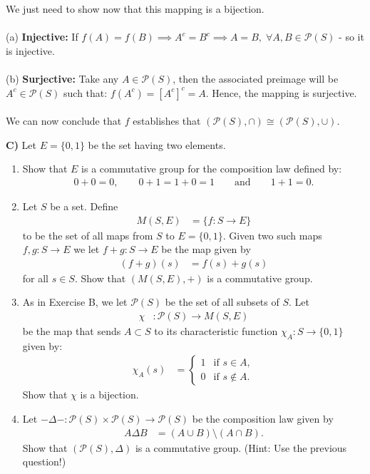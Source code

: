 \documentclass[12pt,a4paper]{article}
\begin{document}
\newpage
\noindent
We just need to show now that this mapping is a bijection.\\
\\
(a) \textbf{Injective:} If $f(A) = f(B) \implies A^c = B^c \implies A = B, \; \forall A,B \in \mathcal{P}(S)$ - so it is injective.\\
\\
(b) \textbf{Surjective:} Take any $A \in \mathcal{P}(S)$, then the associated preimage will be $A^c \in \mathcal{P}(S)$ such that:
$f(A^c) = [A^c]^c = A$.  Hence, the mapping is surjective.\\
\\
We can now conclude that $f$ establishes that $(\mathcal{P}(S), \cap) \cong (\mathcal{P}(S), \cup)$.

\newpage
\noindent\textbf{C)} Let $E=\{0,1\}$ be the set having two elements.
\begin{enumerate}
\renewcommand{\labelenumi}{(\arabic{enumi})}
\item Show that $E$ is a commutative group for the composition law defined by:
\begin{align*}
 0+0=0,\qquad 0+1=1+0=1 \qquad\text{and}\qquad 1+1=0. \tag{C.1}
\end{align*}
\item Let $S$ be a set. Define
\begin{align*}
M(S,E)&=\{f:S\to E\}
\end{align*}
to be the set of all maps from $S$ to $E=\{0,1\}$.
Given two such maps $f,g:S\to E$ we let $f+g:S\to E$ be the map given by
\begin{align*}
(f+g)(s)&=f(s)+g(s)
\end{align*}
for all $s\in S$. Show that $(M(S,E),+)$ is a commutative group.
\item As in Exercise B, we let $\mathcal{P}(S)$ be the set of all subsets
of $S$. Let
\begin{align*}
\chi&:\mathcal{P}(S)\to M(S,E)
\end{align*}
be the map that sends $A\subset S$ to its characteristic function
$\chi_A:S\to\{0,1\}$ given by:
\begin{align*}
\chi_A(s)&=
\begin{cases}
1 & \text{if } s\in A,\\
0 & \text{if } s\notin A.
\end{cases}
\end{align*}
Show that $\chi$ is a bijection.

\item Let $-\Delta-:\mathcal{P}(S)\times\mathcal{P}(S)\to\mathcal{P}(S)$
be the composition law given by
\begin{align*}
A\Delta B&=(A\cup B)\setminus(A\cap B).
\end{align*}
Show that $(\mathcal{P}(S),\Delta)$ is a commutative group.
(Hint: Use the previous question!)

\end{enumerate}
\end{document}
